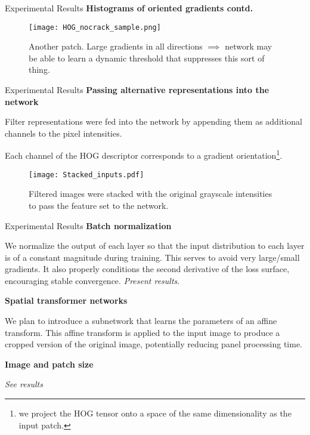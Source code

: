\documentclass[10pt]{beamer}
\begin{document}
\begin{frame}{Experimental Results}
\textbf{Histograms of oriented gradients contd.}

\begin{figure}
	\texttt{[image: HOG\_nocrack\_sample.png]}
	\caption{Another patch. Large gradients in all directions $\implies$ network may be able to learn a dynamic threshold that suppresses this sort of thing.}
\end{figure}

\end{frame}

\begin{frame}{Experimental Results}
\textbf{Passing alternative representations into the network}

Filter representations were fed into the network by appending them as additional channels to the pixel intensities.

Each channel of the HOG descriptor corresponds to a gradient orientation\footnote{we project the HOG tensor onto a space of the same dimensionality as the input patch.}.
\begin{figure}
	\texttt{[image: Stacked\_inputs.pdf]}
	\caption{Filtered images were stacked with the original grayscale intensities to pass the feature set to the network.}
\end{figure}

\end{frame}

\begin{frame}{Experimental Results}
\textbf{Batch normalization}

We normalize the output of each layer so that the input distribution to each layer is of a constant magnitude during training. This serves to avoid very large/small gradients. It also properly conditions the second derivative of the loss surface, encouraging stable convergence. \emph{Present results}.

\textbf{Spatial transformer networks}

We plan to introduce a subnetwork that learns the parameters of an affine transform. This affine transform is applied to the input image to produce a cropped version of the original image, potentially reducing panel processing time.

\textbf{Image and patch size}

\emph{See results }


\end{frame}
\end{document}
